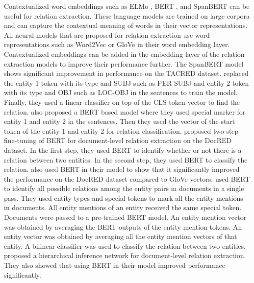 Contextualized word embeddings such as ELMo , BERT , and SpanBERT  can be useful for relation extraction. These language models are trained on large corpora and can capture the contextual meaning of words in their vector representations. All neural models that are proposed for relation extraction use word representations such as Word2Vec  or GloVe  in their word embedding layer. Contextualized embeddings can be added in the embedding layer of the relation extraction models to improve their performance further. The SpanBERT model shows significant improvement in performance on the TACRED dataset.  replaced the entity 1 token with its type and SUBJ such as PER-SUBJ and entity 2 token with its type and OBJ such as LOC-OBJ in the sentences to train the model. Finally, they used a linear classifier on top of the CLS token vector to find the relation.  also proposed a BERT based model where they used special marker for entity 1 and entity 2 in the sentences. Then they used the vector of the start token of the entity 1 and entity 2 for relation classification. 
 proposed two-step fine-tuning of BERT for document-level relation extraction on the DocRED dataset. In the first step, they used BERT to identify whether or not there is a relation between two entities. In the second step, they used BERT to classify the relation.  also used BERT in their model to show that it significantly improved the performance on the DocRED dataset compared to GloVe vectors.  used BERT to identify all possible relations among the entity pairs in documents in a single pass. They used entity types and special tokens to mark all the entity mentions in documents. All entity mentions of an entity received the same special token. Documents were passed to a pre-trained BERT model. An entity mention vector was obtained by averaging the BERT outputs of the entity mention tokens. An entity vector was obtained by averaging all the entity mention vectors of that entity. A bilinear classifier was used to classify the relation between two entities.  proposed a hierarchical inference network for document-level relation extraction. They also showed that using BERT in their model improved performance significantly. 
